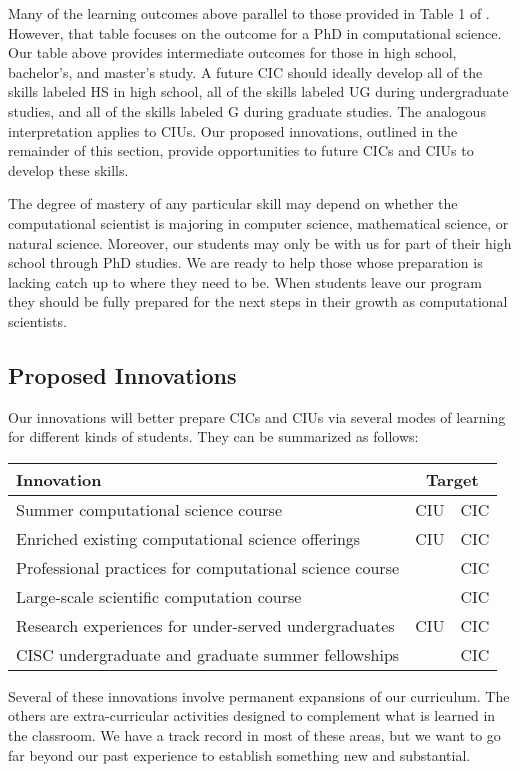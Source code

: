 \documentclass[11pt]{NSFamsart}
\begin{document}
Many of the learning outcomes above parallel to those provided in Table 1 of \cite{RudEtal18a}. However, that table focuses on the outcome for a PhD in computational science.  Our table above provides intermediate outcomes for those in high school, bachelor's, and master's study.  A future CIC should ideally develop all of the skills labeled HS in high school, all of the skills labeled UG during undergraduate studies, and all of the skills labeled G during graduate studies.  The analogous interpretation applies to CIUs.  Our proposed innovations, outlined in the remainder of this section, provide opportunities to future CICs and CIUs to develop these skills.  

The degree of mastery of any particular skill may depend on whether the computational scientist is majoring in computer science, mathematical science, or natural science.  Moreover, our students may only be with us for part of their high school through PhD studies.  We are ready to help those whose preparation is lacking catch up to where they need to be.  When students leave our program they should be fully prepared for the next steps in their growth as computational scientists.

\subsection{Proposed Innovations}
\newcommand{\CampName}{Summer computational science course}
\newcommand{\CurrExistName}{Enriched existing computational science offerings}
\newcommand{\RelSoftName}{Professional practices for computational science course} 
\newcommand{\UGradParallelName}{Undergraduate parallel and distributed computing class}
\newcommand{\LargeSCName}{Large-scale scientific computation course}
\newcommand{\PhyChemBioCompSciName}{New computational natural sciences course}
\newcommand{\CODSummerName}{Research experiences for under-served undergraduates}
\newcommand{\FellowName}{CISC undergraduate and graduate summer fellowships}

Our innovations will better prepare CICs and CIUs via several modes of learning for different kinds of students.  They can be summarized as follows:

\begin{center}
\begin{tabular}
{lcc}
Innovation & \multicolumn{2}{c}{Target} \tabularnewline
\toprule
\CampName & CIU & CIC \tabularnewline
\CurrExistName & CIU & CIC \tabularnewline
\RelSoftName &  & CIC \tabularnewline
\LargeSCName &  & CIC \tabularnewline
\CODSummerName & CIU & CIC \tabularnewline
\FellowName &  & CIC \tabularnewline
\bottomrule
\end{tabular}
\end{center}
Several of these innovations involve permanent expansions of our curriculum. The others are extra-curricular activities designed to complement what is learned in the classroom.  We have a track record in most of these areas, but we want to go far beyond our past experience to establish something new and substantial.
\end{document}
